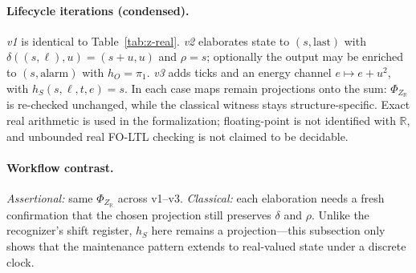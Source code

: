 \paragraph{Lifecycle iterations (condensed).}
\textit{v1} is identical to Table~\ref{tab:z-real}. \textit{v2} elaborates state to $(s,\mathrm{last})$ with $\delta((s,\ell),u)=(s{+}u,u)$ and $\rho=s$; optionally the output may be enriched to $(s,\mathrm{alarm})$ with $h_O=\pi_1$. \textit{v3} adds ticks and an energy channel $e\mapsto e+u^{2}$, with $h_S(s,\ell,t,e)=s$. In each case maps remain projections onto the sum: $\Phi_{Z_{\mathbb{R}}}$ is re-checked unchanged, while the classical witness stays structure-specific. Exact real arithmetic is used in the formalization; floating-point is not identified with $\mathbb{R}$, and unbounded real FO-LTL checking is not claimed to be decidable.

\paragraph{Workflow contrast.}
\textit{Assertional:} same $\Phi_{Z_{\mathbb{R}}}$ across v1--v3. \textit{Classical:} each elaboration needs a fresh confirmation that the chosen projection still preserves $\delta$ and $\rho$. Unlike the recognizer's shift register, $h_S$ here remains a projection---this subsection only shows that the maintenance pattern extends to real-valued state under a discrete clock.

